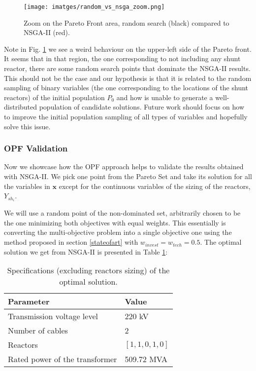 \documentclass[a4paper,11pt, titlepage, twoside]{article}
\begin{document}
\begin{figure}[H]
    \centering
    \texttt{[image: imatges/random\_vs\_nsga\_zoom.png]}
    \caption{Zoom on the Pareto Front area, random search (black) compared to NSGA-II (red).}
    \label{fig:paretpnsga}
\end{figure}

Note in Fig. \ref{fig:paretpnsga} we see a weird behaviour on the upper-left side of the Pareto front. It seems that in that region, the one corresponding to not including any shunt reactor, there are some random search points that dominate the NSGA-II
results. This should not be the case and our hypothesis is that it is related to the random sampling of binary variables (the one corresponding to the locations of the shunt reactors) of the initial population $P_0$ and how is unable to generate a well-distributed population of candidate solutions.
Future work should focus on how to improve the initial population sampling of all types of variables and hopefully solve this issue. 


\subsubsection{OPF Validation}

Now we showcase how the OPF approach helps to validate the results obtained with NSGA-II. We pick one point from the Pareto Set and  take its solution for all the variables in $\mathbf{x}$
except for the continuous variables of the sizing of the reactors, $Y_{sh_i}$.

We will use a random point of the non-dominated set, arbitrarily chosen to be the one minimizing both objectives with equal weights. This essentially is converting the multi-objective problem into a single objective one using the method proposed in section \ref{stateofart} with $w_{invest} = w_{tech} = 0.5$. The optimal solution we get from NSGA-II is
presented in Table \ref{table:optimalvaluesdicrete}:

\begin{table}[H]
    \centering
    \begin{tabular}{l l}
    \hline
    \textbf{Parameter} & \textbf{Value} \\
    \hline
    Transmission voltage level & 220 kV \\
    Number of cables & 2 \\
    Reactors & $[1, 1, 0, 1, 0]$ \\
    Rated power of the transformer & 509.72 MVA \\
    \hline
    \end{tabular}
    \caption{Specifications (excluding reactors sizing) of the optimal solution.}
    \label{table:optimalvaluesdicrete}
    \end{table}
\end{document}
